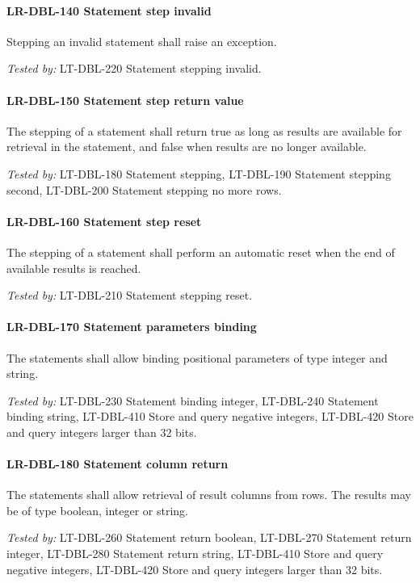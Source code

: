 \paragraph{LR-DBL-140 Statement step invalid}
Stepping an invalid statement shall raise an exception.

\textit{Tested by: } LT-DBL-220 Statement stepping invalid.

\paragraph{LR-DBL-150 Statement step return value}
The stepping of a statement shall return true as long as results
are available for retrieval in the statement, and false when results
are no longer available.

\textit{Tested by: } LT-DBL-180 Statement stepping,
LT-DBL-190 Statement stepping second,
LT-DBL-200 Statement stepping no more rows.

\paragraph{LR-DBL-160 Statement step reset}
The stepping of a statement shall perform an automatic reset when
the end of available results is reached.

\textit{Tested by: } LT-DBL-210 Statement stepping reset.

\paragraph{LR-DBL-170 Statement parameters binding}
The statements shall allow binding positional parameters of type
integer and string.

\textit{Tested by: } LT-DBL-230 Statement binding integer,
LT-DBL-240 Statement binding string,
LT-DBL-410 Store and query negative integers,
LT-DBL-420 Store and query integers larger than 32 bits.

\paragraph{LR-DBL-180 Statement column return}
The statements shall allow retrieval of result columns from rows.
The results may be of type boolean, integer or string.

\textit{Tested by: } LT-DBL-260 Statement return boolean,
LT-DBL-270 Statement return integer,
LT-DBL-280 Statement return string,
LT-DBL-410 Store and query negative integers,
LT-DBL-420 Store and query integers larger than 32 bits.

